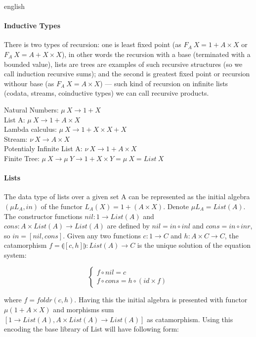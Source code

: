 \documentclass{abstract}
\begin{document}
\begin{theses}{english}
  \paragraph{Inductive Types}
  There is two types of recursion: one is least fixed point (as $F_A\ X = 1 + A\times X$ or $F_A\ X = A + X\times X$),
  in other words the recursion with a base (terminated with a bounded value), lists are trees are
  examples of such recursive structures (so we call induction recursive sums); and the second
  is greatest fixed point or recursion withour base (as $F_A\ X = A\times X $) --- such kind of
  recursion on infinite lists (codata, streams, coinductive types) we can call recursive products.

\begin{center}
  Natural Numbers: $\mu\ X \rightarrow 1 + X$ \\
  List A: $\mu\ X \rightarrow 1 + A \times X$ \\
  Lambda calculus: $\mu\ X \rightarrow 1 + X \times X + X$ \\
  Stream: $\nu\ X \rightarrow A \times X$ \\
  Potentialy Infinite List A: $\nu\ X \rightarrow 1 + A \times X$ \\
  Finite Tree: $\mu\ X \rightarrow \mu\ Y \rightarrow 1 + X \times Y = \mu\ X = List\ X$ \\
\end{center}

  \paragraph{Lists}
  The data type of lists over a given set A can be represented as the initial algebra
  $(\mu L_A, in)$ of the functor $L_A(X) = 1 + (A \times X)$. Denote $\mu L_A = List(A)$.
  The constructor functions $nil: 1 \rightarrow List(A)$ and
  $cons: A \times List(A) \rightarrow List(A)$ are defined by
  $nil = in \circ inl$ and $cons = in \circ inr$, so $in = [nil,cons]$.
  Given any two functions $c: 1 \rightarrow C$ and $h: A \times C \rightarrow C$,
  the catamorphism $f = \llparenthesis [c,h] \rrparenthesis : List(A) \rightarrow C$
  is the unique solution of the equation system:

$$
\begin{cases}
  f \circ nil  = c \\
  f \circ cons = h \circ (id \times f)
\end{cases}
$$

  where $f = foldr(c,h)$. Having this the initial algebra is presented with functor
  $\mu (1 + A \times X)$ and morphisms sum $[1 \rightarrow List(A), A \times List(A) \rightarrow List(A)]$
  as catamorphism. Using this encoding the base library of List will have following form:


\end{theses}
\end{document}
